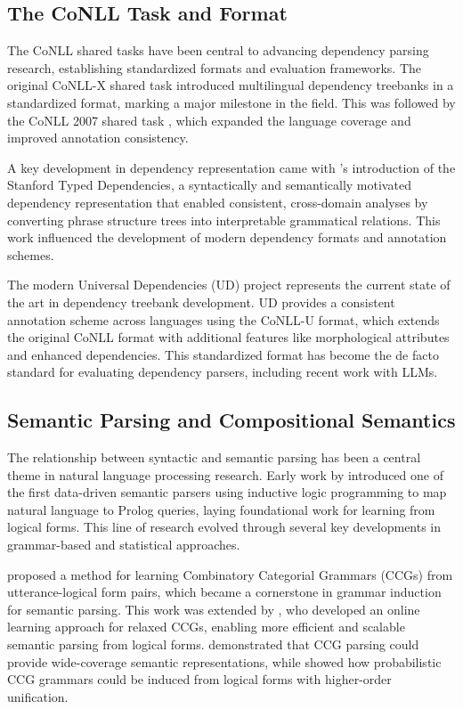 \subsection{The CoNLL Task and Format}

The CoNLL shared tasks have been central to advancing dependency parsing research, establishing standardized formats and evaluation frameworks. The original CoNLL-X shared task \citep{buchholz2006conll} introduced multilingual dependency treebanks in a standardized format, marking a major milestone in the field. This was followed by the CoNLL 2007 shared task \citep{nivre2007conll}, which expanded the language coverage and improved annotation consistency.

A key development in dependency representation came with \citet{de2006generating}'s introduction of the Stanford Typed Dependencies, a syntactically and semantically motivated dependency representation that enabled consistent, cross-domain analyses by converting phrase structure trees into interpretable grammatical relations. This work influenced the development of modern dependency formats and annotation schemes.

The modern Universal Dependencies (UD) project \citep{nivre2016universal} represents the current state of the art in dependency treebank development. UD provides a consistent annotation scheme across languages using the CoNLL-U format, which extends the original CoNLL format with additional features like morphological attributes and enhanced dependencies. This standardized format has become the de facto standard for evaluating dependency parsers, including recent work with LLMs.

\subsection{Semantic Parsing and Compositional Semantics}

The relationship between syntactic and semantic parsing has been a central theme in natural language processing research. Early work by \citet{zelle1996} introduced one of the first data-driven semantic parsers using inductive logic programming to map natural language to Prolog queries, laying foundational work for learning from logical forms. This line of research evolved through several key developments in grammar-based and statistical approaches.

\citet{zettlemoyer2005} proposed a method for learning Combinatory Categorial Grammars (CCGs) from utterance-logical form pairs, which became a cornerstone in grammar induction for semantic parsing. This work was extended by \citet{zettlemoyer2007online}, who developed an online learning approach for relaxed CCGs, enabling more efficient and scalable semantic parsing from logical forms. \citet{bos2004} demonstrated that CCG parsing could provide wide-coverage semantic representations, while \citet{kwiatkowski2010} showed how probabilistic CCG grammars could be induced from logical forms with higher-order unification.

